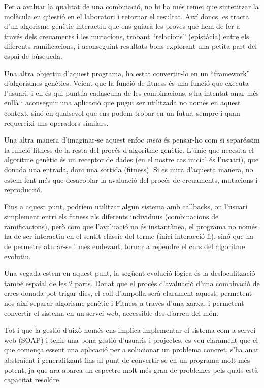 \documentclass[titlepage,a4paper,12pt]{book}
\begin{document}
	Per a avaluar la qualitat de una combinació, no hi ha més remei que
	sintetitzar la molècula en qüestió en el laboratori i retornar el resultat.
	Així doncs, es tracta d'un algorisme genètic interactiu 
	que ens guiarà les proves que hem de fer a través dels creuaments i les
	mutacions, trobant ``relacions'' (epistàcia) entre els diferents
	ramificacions, i aconseguint resultats bons explorant una petita part del
	espai de búsqueda.

	Una altra objectiu d'aquest programa, ha estat convertir-lo en un
	``framework'' d'algorismes genètics.  Veient que la funció de fitness és una
	funció que executa l'usuari, i ell és qui puntúa cadascuna de les
	combinacions, s'ha intentat anar més enllà i aconseguir una aplicació que
	pugui ser utilitzada no només en aquest context, sinó en qualsevol que ens
	podem trobar en un futur, sempre i quan requereixi uns operadors similars.

	Una altra manera d'imaginar-se aquest enfoc \emph{meta} és pensar-ho com si
	separéssim la funció fitness de la resta del procés d'algoritme genètic.
	L'únic que necesita el algoritme genètic és un receptor de dades (en el
	nostre cas inicial és l'usuari), que donada una entrada, doni una
	sortida (fitness).  Si es mira d'aquesta manera, no estem fent més que
	desacoblar la avaluació del procés de creuaments, mutacions i reproducció.

	Fins a aquest punt, podríem utilitzar algun sistema amb callbacks, on
	l'usuari simplement entri els fitness als diferents individuus (combinacions
	de ramificacions), però com que l'avaluació no és instantànea, el programa no
	només ha de ser interactiu en el sentit clàssic del terme (inici-interacció-fi),
	sinó que ha de permetre aturar-se i més endevant, tornar a rependre el curs
	del algoritme evolutiu. 

	Una vegada estem en aquest punt, la següent evolució lògica és la
	deslocalització també espaial de les 2 parts.  Donat que el procés
	d'avaluació d'una combinació de erres donada pot trigar dies, el coll
	d'ampolla serà clarament aquest, permetent-nos així separar algorisme
	genètic i Fitness a través d'una xarxa, i permetent convertir el sistema en
	un servei web, accessible des d'arreu del món.

	Tot i que la gestió d'això només ens implica implementar el sistema com a
	servei web (SOAP) i tenir una bona gestió d'usuaris i projectes, es veu
	clarament que el que comença essent una aplicació per a solucionar un
	problema concret, s'ha anat abstraient i generalitzant fins al punt de
	convertir-se en un programa molt més potent, ja que ara abarca un espectre
	molt més gran de problemes pels quals està capacitat resoldre.
\end{document}

